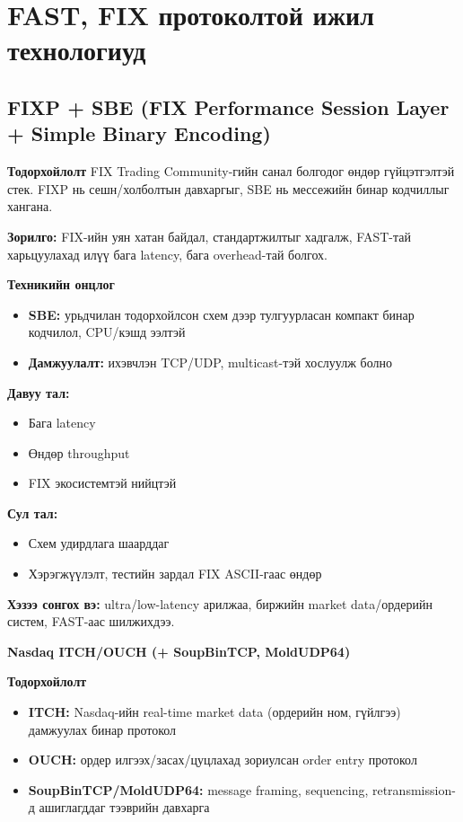 \section{FAST, FIX протоколтой ижил технологиуд}
\subsection{FIXP + SBE (FIX Performance Session Layer + Simple Binary Encoding)}

\textbf{Тодорхойлолт}
 FIX Trading Community-гийн санал болгодог өндөр гүйцэтгэлтэй стек. FIXP нь сешн/холболтын давхаргыг, SBE нь мессежийн бинар кодчиллыг хангана.

\textbf{Зорилго:} FIX-ийн уян хатан байдал, стандартжилтыг хадгалж, FAST-тай харьцуулахад илүү бага latency, бага overhead-тай болгох.

\textbf{Техникийн онцлог}
\begin{itemize}
    \item \textbf{SBE:} урьдчилан тодорхойлсон схем дээр тулгуурласан компакт бинар кодчилол, CPU/кэшд ээлтэй
    \item \textbf{Дамжуулалт:} ихэвчлэн TCP/UDP, multicast-тэй хослуулж болно
\end{itemize}


{\textbf{Давуу тал:}}
\begin{itemize}
    \item Бага latency
    \item Өндөр throughput
    \item FIX экосистемтэй нийцтэй
\end{itemize}

{\textbf{Сул тал:}}
\begin{itemize}
    \item Схем удирдлага шаарддаг
    \item Хэрэгжүүлэлт, тестийн зардал FIX ASCII-гаас өндөр
\end{itemize}

\textbf{Хэзээ сонгох вэ:} ultra/low-latency арилжаа, биржийн market data/ордерийн систем, FAST-аас шилжихдээ. \par

\textbf{Nasdaq ITCH/OUCH (+ SoupBinTCP, MoldUDP64)}
    
\textbf{Тодорхойлолт}
\begin{itemize}
    \item \textbf{ITCH:} Nasdaq-ийн real-time market data (ордерийн ном, гүйлгээ) дамжуулах бинар протокол
    \item \textbf{OUCH:} ордер илгээх/засах/цуцлахад зориулсан order entry протокол
    \item \textbf{SoupBinTCP/MoldUDP64:} message framing, sequencing, retransmission-д ашиглагддаг тээврийн давхарга
\end{itemize}

